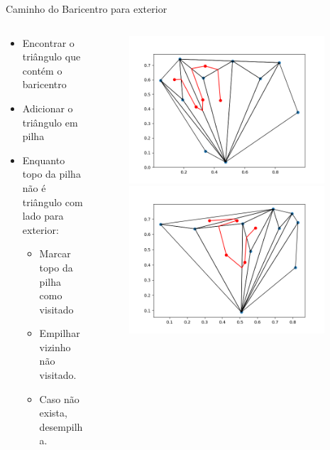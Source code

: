 \documentclass[aspectratio=169,usenames,dvipsnames]{beamer}
\begin{document}
\begin{frame}{Caminho do Baricentro para exterior}

  \begin{columns}
    \begin{column}{0.5\textwidth}
      \begin{itemize}
        \item Encontrar o triângulo que contém o baricentro
        \item Adicionar o triângulo em pilha
        \item Enquanto topo da pilha não é triângulo com lado para exterior:
        \begin{itemize}
          \item Marcar topo da pilha como visitado
          \item Empilhar vizinho não visitado.
          \item Caso não exista, desempilha.
        \end{itemize}
      \end{itemize}
    \end{column}
    \begin{column}{0.5\textwidth}
      \begin{figure}
        \begin{overprint}
          \includegraphics[width=0.95\textwidth]{./figs/bom_exemplo_0_graham_path.png}
          \includegraphics[width=0.95\textwidth]{./figs/bom_exemplo_1_graham_path.png}

\end{overprint}
\end{figure}
\end{column}
\end{columns}
\end{frame}
\end{document}
